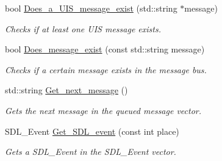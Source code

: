 \begin{DoxyCompactItemize}
bool \hyperlink{classjetfuel_1_1core_1_1Message__bus_a0b91a46865f5888bd1c3e2e3bdbc49ee}{Does\+\_\+a\+\_\+\+U\+I\+S\+\_\+message\+\_\+exist} (std\+::string $\ast$message)
\begin{DoxyCompactList}\small\item\em Checks if at least one U\+IS message exists. \end{DoxyCompactList}\item 
bool \hyperlink{classjetfuel_1_1core_1_1Message__bus_a9bbbbea3cd97a8f8253e08b700dbd05d}{Does\+\_\+message\+\_\+exist} (const std\+::string message)
\begin{DoxyCompactList}\small\item\em Checks if a certain message exists in the message bus. \end{DoxyCompactList}\item 
std\+::string \hyperlink{classjetfuel_1_1core_1_1Message__bus_ae79fcd8945a1d72bbebc838be6d23a1f}{Get\+\_\+next\+\_\+message} ()
\begin{DoxyCompactList}\small\item\em Gets the next message in the queued message vector. \end{DoxyCompactList}\item 
S\+D\+L\+\_\+\+Event \hyperlink{classjetfuel_1_1core_1_1Message__bus_ab80c8b51aca00ad4942ee2114fdf2fec}{Get\+\_\+\+S\+D\+L\+\_\+event} (const int place)
\begin{DoxyCompactList}\small\item\em Gets a S\+D\+L\+\_\+\+Event in the S\+D\+L\+\_\+\+Event vector. \end{DoxyCompactList}\end{DoxyCompactItemize}
